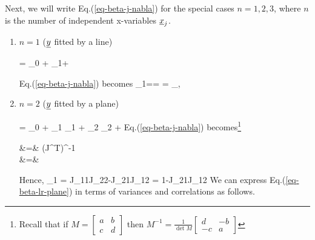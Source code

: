 Next, we will
write
 Eq.(\ref{eq-beta-j-nabla})
for the special cases
$n=1,2,3$,
where $n$ is the
number of independent x-variables $\rvx_j$.

\begin{enumerate}
\item $n=1$ ($\rvy$ fitted by a line)

\beq
\rvy = \beta_0 + \beta_1\rvx + \rveps
\eeq

Eq.(\ref{eq-beta-j-nabla}) becomes
\beq
\beta_1=\pder{\rvy}{\rvx}=
\frac{\av{\rvx,\rvy}}{\av{\rvx,\rvx}}
=
\rho_{\rvx,\rvy}
\frac{\s_\rvy}{\s_\rvx}
\eeq


\item $n=2$ ($\rvy$ fitted by a plane)


\beq
\rvy = \beta_0 + \beta_1 \rvx_1 + \beta_2 \rvx_2 +\rveps
\eeq
Eq.(\ref{eq-beta-j-nabla})
becomes\footnote{
Recall that if
$
M=
\left[
\begin{array}{cc}
a&b
\\
c&d
\end{array}
\right]
$
then
$
M^{-1}
=
\frac{1}{\det M}
\left[
\begin{array}{cc}
d&-b
\\
-c&a
\end{array}
\right]
$
}


\beqa
{}
&=&
(J^T)^{-1}
\\
&=&
\left[
\begin{array}{cc}
J_{22}&-J_{21}
\\
-J_{12}&J_{11}
\end{array}
\right]
\eeqa


Hence,
\beq
\beta_1
=
{
J_{11}J_{22}-J_{21}J_{12}
}=
{
1-J_{21}J_{12}
}
\label{eq-beta-lr-plane}
\eeq
We can express
Eq.(\ref{eq-beta-lr-plane})
in terms of variances
and correlations as follows.



\end{enumerate}
